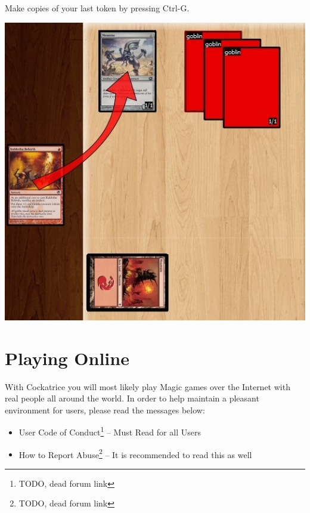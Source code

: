 \documentclass[a4paper]{scrbook}
\begin{document}
Make copies of your last token by pressing Ctrl-G.
\begin{center}
\includegraphics[scale=0.5]{pics/fetch6847}
\end{center}

\chapter{Playing Online}
 With Cockatrice you will most likely play Magic games over the Internet with real people all around the world. In order to help maintain a pleasant environment for users, please read the messages below:

\begin{itemize}
 \item User Code of Conduct\footnote{TODO, dead forum link} -- Must Read for all Users
 \item How to Report Abuse\footnote{TODO, dead forum link} -- It is recommended to read this as well 
\end{itemize}
\end{document}
